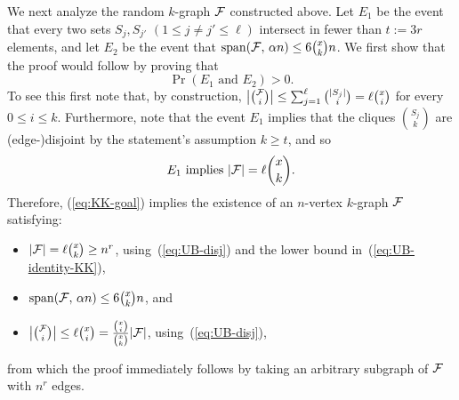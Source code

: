 \documentclass[11pt]{article}
\makeatletter
\renewenvironment{proof}[1][\proofname]
{\par\pushQED{\qed}
	\normalfont\topsep6\p@\@plus6\p@\relax\trivlist
	\item[\hskip\labelsep\bfseries#1\@addpunct{.}]
	\ignorespaces}
{\popQED\endtrivlist\@endpefalse}
\newcommand{\FF}{{\cal F}}
\renewcommand{\wp}{\mathrm{span}}
\renewcommand{\a}{\alpha}
\makeatother
\begin{document}
\begin{proof}[Proof of Theorem~\ref{theo:sKK-UB}]
	We next analyze the random $k$-graph $\FF$ constructed above.
	Let $E_1$ be the event that every two sets $S_j,S_{j'}$ $(1 \le j\neq j' \le \ell)$ intersect in fewer than $t:=3r$ elements, 
	and let $E_2$ be the event that $\wp(\FF,\, \a n) \le 6\binom{x}{k}n$. %
	We first show that the proof would follow by proving that %
	\begin{equation}\label{eq:KK-goal}
	\Pr(E_1 \text{ and } E_2) > 0 .
	\end{equation}
	To see this first note that, by construction, $\big|\binom{\FF}{i}\big| \le \sum_{j=1}^\ell \binom{|S_j|}{i} = \ell\binom{x}{i}$ for every $0 \le i \le k$.
	Furthermore, note that the event $E_1$ implies that the cliques $\binom{S_j}{k}$ are (edge-)disjoint by the statement's assumption $k\ge t$, and so
	\begin{equation}\label{eq:UB-disj}
	E_1 \text{ implies } |\FF|=\ell \binom{x}{k}.
	\end{equation}
	Therefore, (\ref{eq:KK-goal}) implies the existence of an $n$-vertex $k$-graph $\FF$ satisfying:
	\begin{itemize}
		\item $|\FF| = \ell \binom{x}{k} \ge n^r$, using~(\ref{eq:UB-disj}) and the lower bound in~(\ref{eq:UB-identity-KK}),
		\item $\wp(\FF,\, \a n) \le 6\binom{x}{k}n$, and
		\item $\big|\binom{\FF}{i}\big| \le \ell\binom{x}{i} = \frac{\binom{x}{i}}{\binom{x}{k}}|\FF|$, using~(\ref{eq:UB-disj}),
	\end{itemize}
	from which the proof immediately follows by taking an arbitrary subgraph of $\FF$ with $n^r$ edges.
	

\end{proof}
\end{document}
